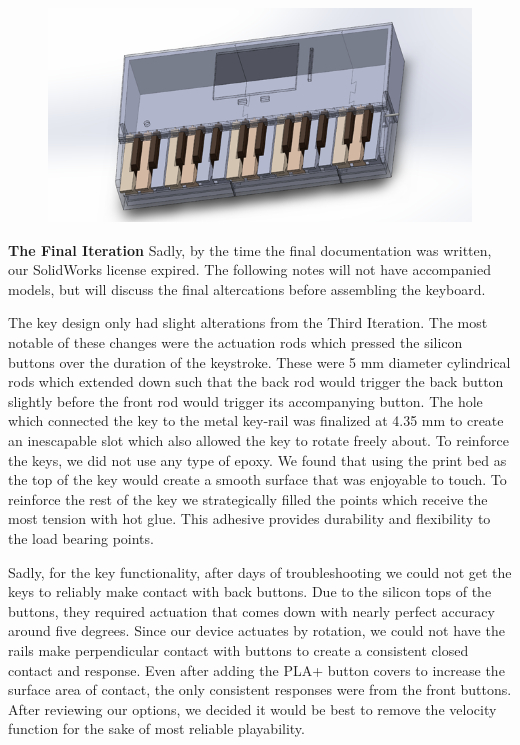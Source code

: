 \begin{figure}[h!]
  \centering
  \includegraphics[width=0.8\linewidth]{image/FinalModel2.png}
  \caption{}
  \label{fig:final_model2}
\end{figure}
\clearpage

\textbf{The Final Iteration}
Sadly, by the time the final documentation was written, our SolidWorks license expired. The following notes will not have accompanied models, but will discuss the final altercations before assembling the keyboard.

The key design only had slight alterations from the Third Iteration. The most notable of these changes were the actuation rods which pressed the silicon buttons over the duration of the keystroke. These were 5 mm diameter cylindrical rods which extended down such that the back rod would trigger the back button slightly before the front rod would trigger its accompanying button. The hole which connected the key to the metal key-rail was finalized at 4.35 mm to create an inescapable slot which also allowed the key to rotate freely about. To reinforce the keys, we did not use any type of epoxy. We found that using the print bed as the top of the key would create a smooth surface that was enjoyable to touch. To reinforce the rest of the key we strategically filled the points which receive the most tension with hot glue. This adhesive provides durability and flexibility to the load bearing points.

Sadly, for the key functionality, after days of troubleshooting we could not get the keys to reliably make contact with back buttons. Due to the silicon tops of the buttons, they required actuation that comes down with nearly perfect accuracy around five degrees. Since our device actuates by rotation, we could not have the rails make perpendicular contact with buttons to create a consistent closed contact and response. Even after adding the PLA+ button covers to increase the surface area of contact, the only consistent responses were from the front buttons. After reviewing our options, we decided it would be best to remove the velocity function for the sake of most reliable playability.

